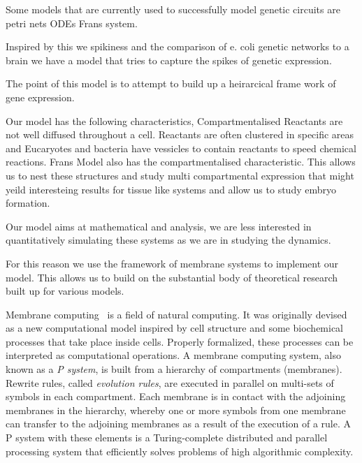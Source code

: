 \documentclass[runningheads,a4paper]{llncs}
\begin{document}
  Some models that are currently used to successfully model genetic circuits are 
    petri nets
    ODEs 
    Frans system. 

  Inspired by this we spikiness and the comparison of e. coli genetic networks 
  to a brain we have a model that tries to capture the spikes of genetic expression.

  The point of this model is to attempt to build up a heirarcical frame work of 
    gene expression. 
  
  Our model has the following characteristics, 
    Compartmentalised 
      Reactants are not well diffused throughout a cell. 
      Reactants are often clustered in specific areas and Eucaryotes and bacteria 
      have vessicles to contain reactants to speed chemical reactions. 
      Frans Model also has the compartmentalised characteristic. 
    This allows us to nest these structures and study multi compartmental expression 
      that might yeild interesteing results for tissue like systems and allow us 
      to study embryo formation.

  Our model aims at mathematical and analysis, we are less interested in quantitatively 
  simulating these systems as we are in studying the dynamics. 

  For this reason we use the framework of membrane systems to implement our model.
  This allows us to build on the substantial body of theoretical research 
  built up for various models. 
  \color{black}

  Membrane computing~\cite{Paun2000} is a field of natural computing. It was
  originally devised as a new computational model inspired by cell structure and
  some biochemical processes that take place inside cells. Properly formalized,
  these processes can be interpreted as computational operations. A membrane
  computing system, also known as a \emph{P system}, is built from a hierarchy of
  compartments (membranes). Rewrite rules, called \emph{evolution rules}, are
  executed in parallel on multi-sets of symbols in each compartment. Each
  membrane is in contact with the adjoining membranes in the hierarchy, whereby
  one or more symbols from one membrane can transfer to the adjoining membranes
  as a result of the execution of a rule. A P system with these elements is a
  Turing-complete distributed and parallel processing system that efficiently
  solves problems of high algorithmic complexity.
\end{document}
